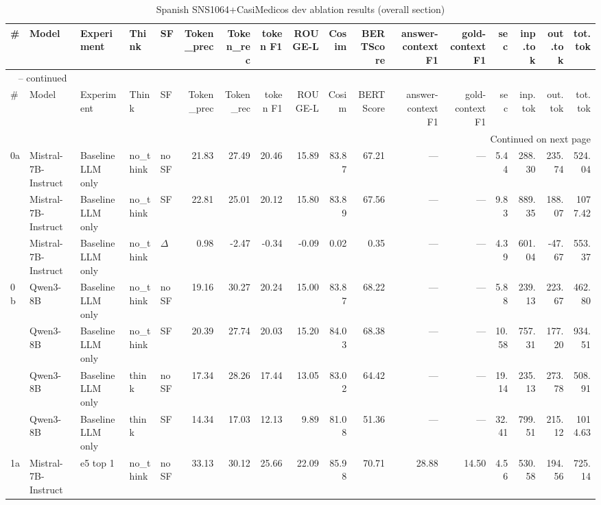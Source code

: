 \begin{landscape}
\begin{footnotesize}
\setlength{\LTcapwidth}{\linewidth}
\begin{longtable}{l l l l l r r r r r r r r r r r r}
\caption{Spanish SNS1064+CasiMedicos dev ablation results (overall section)} \label{tab:es-mixed} \\
\toprule
\# & Model & Experiment & Think & SF & Token\_prec & Token\_rec & token F1 & ROUGE-L & Cosim & BERTScore & answer-context F1 & gold-context F1 & sec & inp.tok & out.tok & tot.tok \\
\midrule
\endfirsthead
\multicolumn{17}{l}{\tablename\ \thetable{} -- continued} \\
\toprule
\# & Model & Experiment & Think & SF & Token\_prec & Token\_rec & token F1 & ROUGE-L & Cosim & BERTScore & answer-context F1 & gold-context F1 & sec & inp.tok & out.tok & tot.tok \\
\midrule
\endhead
\midrule
\multicolumn{17}{r}{Continued on next page} \\
\endfoot
\bottomrule
\endlastfoot
0a & Mistral-7B-Instruct & Baseline LLM only & no\_think & noSF & 21.83 & 27.49 & 20.46 & 15.89 & 83.87 & 67.21 & --- & --- & 5.44 & 288.30 & 235.74 & 524.04 \\
 & Mistral-7B-Instruct & Baseline LLM only & no\_think & SF & 22.81 & 25.01 & 20.12 & 15.80 & 83.89 & 67.56 & --- & --- & 9.83 & 889.35 & 188.07 & 1077.42 \\
 & Mistral-7B-Instruct & Baseline LLM only & no\_think & $\Delta$ & 0.98 & -2.47 & -0.34 & -0.09 & 0.02 & 0.35 & --- & --- & 4.39 & 601.04 & -47.67 & 553.37 \\
0b & Qwen3-8B & Baseline LLM only & no\_think & noSF & 19.16 & 30.27 & 20.24 & 15.00 & 83.87 & 68.22 & --- & --- & 5.88 & 239.13 & 223.67 & 462.80 \\
 & Qwen3-8B & Baseline LLM only & no\_think & SF & 20.39 & 27.74 & 20.03 & 15.20 & 84.03 & 68.38 & --- & --- & 10.58 & 757.31 & 177.20 & 934.51 \\
 & Qwen3-8B & Baseline LLM only & think & noSF & 17.34 & 28.26 & 17.44 & 13.05 & 83.02 & 64.42 & --- & --- & 19.14 & 235.13 & 273.78 & 508.91 \\
 & Qwen3-8B & Baseline LLM only & think & SF & 14.34 & 17.03 & 12.13 & 9.89 & 81.08 & 51.36 & --- & --- & 32.41 & 799.51 & 215.12 & 1014.63 \\
\midrule
1a & Mistral-7B-Instruct & e5 top 1 & no\_think & noSF & 33.13 & 30.12 & 25.66 & 22.09 & 85.98 & 70.71 & 28.88 & 14.50 & 4.56 & 530.58 & 194.56 & 725.14 \\

\end{longtable}
\end{footnotesize}
\end{landscape}
